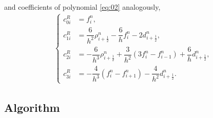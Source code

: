 \documentclass[10pt,a4paper]{article}
\begin{document}
and coefficients of polynomial \eqref{eq:02} analogously,
\begin{align}\label{eq:12}
  \begin{cases}
   c_{0i}^R &= f_i^n, \\
   c_{1i}^R &= \dfrac{6}{h^2}\rho_{i+\frac{1}{2}}^n - \dfrac{6}{h}f_i^n - 2d_{i+\frac{1}{2}}^n,\\
   c_{2i}^R &= -\dfrac{6}{h^3}\rho_{i+\frac{1}{2}}^n + \dfrac{3}{h^2}(3f_i^n-f_{i-1}^n) + \dfrac{6}{h}d_{i+\frac{1}{2}}^n, \\
   c_{3i}^R &= -\dfrac{4}{h^3}(f_i^n-f_{i+1}^n) - \dfrac{4}{h^2}d_{i+\frac{1}{2}}^n.
  \end{cases}
\end{align}


\subsection{Algorithm}
\end{document}
